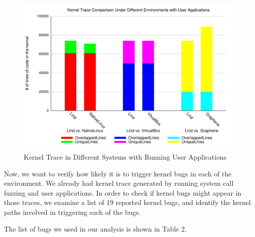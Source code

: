 \begin{figure}[h]
\centering
\includegraphics[width=1.0\columnwidth]{diagram/lind_ccs15_diagram_04.pdf}
\caption{Kernel Trace in Different Systems with Running User Applications}
\label{fig:different_systems_userapplications_trace}
\end{figure}

Now, we want to verify how likely it is to trigger kernel bugs in each of the environment.
We already had kernel trace generated by running system call fuzzing and user applications.
In order to check if kernel bugs might appear in those traces, we examine a list of 19 reported 
kernel bugs, and identify the kernel paths involved in triggering each of the bugs.

The list of bugs we used in our analysis is shown in Table 2.

